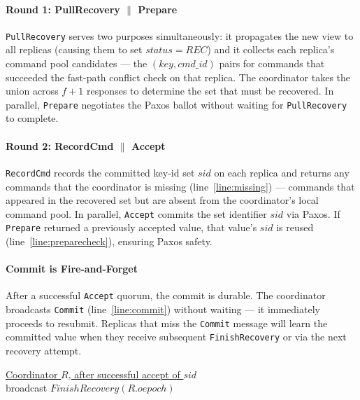 \documentclass[twocolumn]{article}
\begin{document}
\paragraph{Round 1: PullRecovery $\|$ Prepare}
\texttt{PullRecovery} serves two purposes simultaneously: it propagates the new view to all replicas (causing them to set $status = REC$) and it collects each replica's command pool candidates — the $(key, cmd\_id)$ pairs for commands that succeeded the fast-path conflict check on that replica. The coordinator takes the union across $f+1$ responses to determine the set that must be recovered. In parallel, \texttt{Prepare} negotiates the Paxos ballot without waiting for \texttt{PullRecovery} to complete.

\paragraph{Round 2: RecordCmd $\|$ Accept}
\texttt{RecordCmd} records the committed key-id set $sid$ on each replica and returns any commands that the coordinator is missing (line~\ref{line:missing}) — commands that appeared in the recovered set but are absent from the coordinator's local command pool. In parallel, \texttt{Accept} commits the set identifier $sid$ via Paxos. If \texttt{Prepare} returned a previously accepted value, that value's $sid$ is reused (line~\ref{line:preparecheck}), ensuring Paxos safety.

\paragraph{Commit is Fire-and-Forget}
After a successful \texttt{Accept} quorum, the commit is durable. The coordinator broadcasts \texttt{Commit} (line~\ref{line:commit}) without waiting — it immediately proceeds to resubmit. Replicas that miss the \texttt{Commit} message will learn the committed value when they receive subsequent \texttt{FinishRecovery} or via the next recovery attempt.


\begin{algorithm}
\caption{$JetpackResubmit(sid)$}
\label{alg:resubmit}
\setcounter{AlgoLine}{65}

\underline{Coordinator $R$, after successful accept of $sid$}\\
broadcast $FinishRecovery(R.oepoch)$\label{line:finishrecovery}
\end{algorithm}
\end{document}
